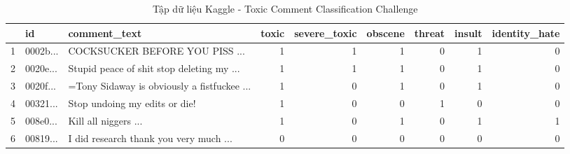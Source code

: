 \begin{table}[h]
    \centering
    \fontsize{10pt}{15pt}\selectfont
    \caption{Tập dữ liệu Kaggle - Toxic Comment Classification Challenge}
    \begin{tabularx}{0.98\textwidth}{llXrrrrrr}
        \hline
          & \textbf{id} & \textbf{comment\_text}                             & \textbf{toxic} & \textbf{severe\_toxic} & \textbf{obscene} & \textbf{threat} & \textbf{insult} & \textbf{identity\_hate} \\\hline
          1 & 0002b... & COCKSUCKER BEFORE YOU PISS ...              & 1 & 1 & 1 & 0 & 1 & 0 \\
          2 & 0020e... & Stupid peace of shit stop deleting my ...   & 1 & 1 & 1 & 0 & 1 & 0 \\
          3 & 0020f... & =Tony Sidaway is obviously a fistfuckee ... & 1 & 0 & 1 & 0 & 1 & 0 \\
          4 & 00321... & Stop undoing my edits or die!               & 1 & 0 & 0 & 1 & 0 & 0 \\
          5 & 008e0... & Kill all niggers ...                        & 1 & 0 & 1 & 0 & 1 & 1 \\
          6 & 00819... & I did research thank you very much ...      & 0 & 0 & 0 & 0 & 0 & 0 \\\hline
    \end{tabularx}
\end{table}